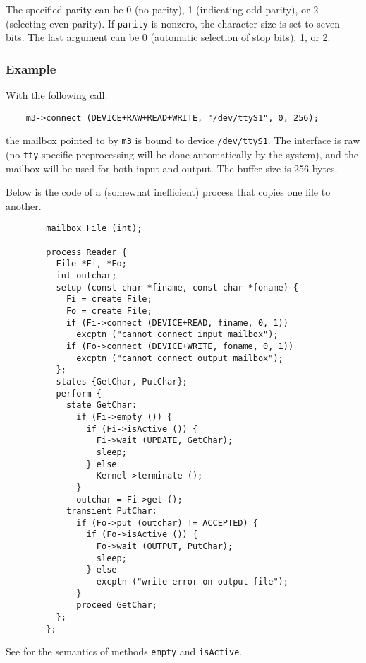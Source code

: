 The specified parity can be 0 (no parity), 1 (indicating odd parity), or
2 (selecting even parity).
If {\tt parity} is nonzero, the character size is set to seven bits.
The last argument can be 0 (automatic selection of stop bits), 1, or 2.

\subsubsection*{Example}

\noindent
With the following call:
\begin{verbatim}
    m3->connect (DEVICE+RAW+READ+WRITE, "/dev/ttyS1", 0, 256);
\end{verbatim}
the mailbox pointed to by {\tt m3} is bound to device
{\tt /dev/ttyS1}.
The interface is raw (no {\tt tty}-specific preprocessing will be done
automatically by the system), and the mailbox will be used for both
input and output.
The buffer size is 256 bytes.

Below is the code of a (somewhat inefficient) process that copies one
file to another.

\begin{verbatim}
        mailbox File (int);

        process Reader {
          File *Fi, *Fo;
          int outchar;
          setup (const char *finame, const char *foname) {
            Fi = create File;
            Fo = create File;
            if (Fi->connect (DEVICE+READ, finame, 0, 1))
              excptn ("cannot connect input mailbox");
            if (Fo->connect (DEVICE+WRITE, foname, 0, 1))
              excptn ("cannot connect output mailbox");
          };
          states {GetChar, PutChar};
          perform {
            state GetChar:
              if (Fi->empty ()) {
                if (Fi->isActive ()) {
                  Fi->wait (UPDATE, GetChar);
                  sleep;
                } else
                  Kernel->terminate ();
              }
              outchar = Fi->get ();
            transient PutChar:
              if (Fo->put (outchar) != ACCEPTED) {
                if (Fo->isActive ()) {
                  Fo->wait (OUTPUT, PutChar);
                  sleep;
                } else
                  excptn ("write error on output file");
              }
              proceed GetChar;
          };
        };
\end{verbatim}

See  for the semantics of methods
{\tt empty} and {\tt isActive}.

